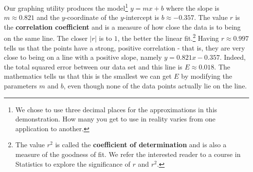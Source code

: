 \documentclass{ximera}
\begin{document}
\begin{center}


\end{center}

Our graphing utility produces the model\footnote{We chose to use three decimal places for the approximations in this demonstration.  How many you get to use in reality varies from one application to another.} $y=mx+b$ where the slope is $m \approx 0.821$ and the $y$-coordinate of the $y$-intercept is $b \approx -0.357$.  The value $r$ is the \textbf{correlation coefficient} and is a measure of how close the data is to being on the same line.  The closer $|r|$ is to $1$, the better the linear fit.\footnote{The value $r^2$ is called the \textbf{coefficient of determination} and is also a measure of the goodness of fit. We refer the interested reader to a course in Statistics to explore the significance of $r$ and $r^2$.} Having $r \approx 0.997$ tells us that the points have a strong, positive correlation - that is, they are very close to being on a line with a positive slope, namely $y = 0.821x - 0.357$.   Indeed, the total squared error between our data set and this line is $E \approx 0.018$. The mathematics tells us that this is the smallest we can get $E$ by modifying the parameters $m$ and $b$, even though none of the data points actually lie on the line.  
\end{document}
